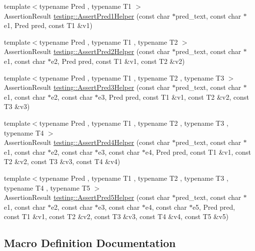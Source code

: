 \begin{DoxyCompactItemize}
\item 
{\footnotesize template$<$typename Pred , typename T1 $>$ }\\Assertion\+Result \mbox{\hyperlink{namespacetesting_a7f73180474723be6e92185d6fa9e7c9f}{testing\+::\+Assert\+Pred1\+Helper}} (const char $\ast$pred\+\_\+text, const char $\ast$e1, Pred pred, const T1 \&v1)
\item 
{\footnotesize template$<$typename Pred , typename T1 , typename T2 $>$ }\\Assertion\+Result \mbox{\hyperlink{namespacetesting_aa6587938029dd8733ecb885068f08247}{testing\+::\+Assert\+Pred2\+Helper}} (const char $\ast$pred\+\_\+text, const char $\ast$e1, const char $\ast$e2, Pred pred, const T1 \&v1, const T2 \&v2)
\item 
{\footnotesize template$<$typename Pred , typename T1 , typename T2 , typename T3 $>$ }\\Assertion\+Result \mbox{\hyperlink{namespacetesting_ac92dcbd00a0ffb2913e65d286e321a22}{testing\+::\+Assert\+Pred3\+Helper}} (const char $\ast$pred\+\_\+text, const char $\ast$e1, const char $\ast$e2, const char $\ast$e3, Pred pred, const T1 \&v1, const T2 \&v2, const T3 \&v3)
\item 
{\footnotesize template$<$typename Pred , typename T1 , typename T2 , typename T3 , typename T4 $>$ }\\Assertion\+Result \mbox{\hyperlink{namespacetesting_ae90c778d69db4682e8fd8baaa0a9f9cd}{testing\+::\+Assert\+Pred4\+Helper}} (const char $\ast$pred\+\_\+text, const char $\ast$e1, const char $\ast$e2, const char $\ast$e3, const char $\ast$e4, Pred pred, const T1 \&v1, const T2 \&v2, const T3 \&v3, const T4 \&v4)
\item 
{\footnotesize template$<$typename Pred , typename T1 , typename T2 , typename T3 , typename T4 , typename T5 $>$ }\\Assertion\+Result \mbox{\hyperlink{namespacetesting_addcf52b273ce17269cbf4956cfe600a6}{testing\+::\+Assert\+Pred5\+Helper}} (const char $\ast$pred\+\_\+text, const char $\ast$e1, const char $\ast$e2, const char $\ast$e3, const char $\ast$e4, const char $\ast$e5, Pred pred, const T1 \&v1, const T2 \&v2, const T3 \&v3, const T4 \&v4, const T5 \&v5)
\end{DoxyCompactItemize}


\subsection{Macro Definition Documentation}
\mbox{\label{_obj__test_2lib_2googletest-release-1_88_81_2googletest_2include_2gtest_2gtest__pred__impl_8h_a7d72f779b7d39b8f73a563ebc6d0604b}} 

